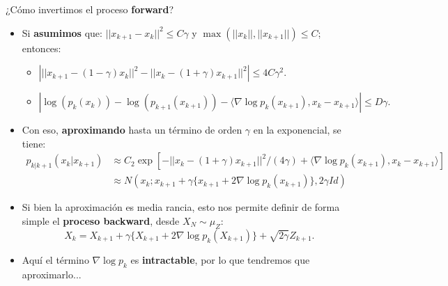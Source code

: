 \documentclass[aspectratio=169,xcolor=dvipsnames, t, spanish]{beamer}
\begin{document}
    \begin{frame}{¿Cómo invertimos el proceso \textbf{forward}?}
        \begin{itemize}
            \item Si \textbf{asumimos} que: $||x_{k+1}-x_{k}||^{2}\le C\gamma$ y $\max(||x_{k}||,||x_{k+1}||)\le C$; entonces:
            \begin{itemize}
                \item $\left| ||x_{k+1}-(1-\gamma)x_{k}||^{2}-||x_{k}-(1+\gamma)x_{k+1}||^{2}\right|\le4C\gamma^{2}.$
                \item $|\log(p_{k}(x_{k}))-\log(p_{k+1}(x_{k+1}))-\langle\nabla \log p_{k}(x_{k+1}),x_{k}-x_{k+1}\rangle|\le D\gamma.$
            \end{itemize}
            \pause
            \item Con eso, \textbf{aproximando} hasta un término de orden $\gamma$ en la exponencial, se tiene:
            \begin{align*}
            p_{k|k+1}(x_{k}|x_{k+1}) &\approx C_{2}\exp\left[-||x_{k}-(1+\gamma)x_{k+1}||^{2}/(4\gamma)+\langle\nabla \log p_{k}(x_{k+1}),x_{k}-x_{k+1}\rangle\right] \\
            &\approx N(x_{k};x_{k+1}+\gamma\{x_{k+1}+2\nabla \log p_{k}(x_{k+1})\},2\gamma Id)
            \end{align*}
            \pause
    
            \item Si bien la aproximación es media rancia, esto nos permite definir de forma simple el \textbf{proceso backward}, desde $X_{N}\sim \mu_Z$:
            \[ X_{k}=X_{k+1}+\gamma\{X_{k+1}+2\nabla \log p_{k}(X_{k+1})\}+\sqrt{2\gamma}Z_{k+1}. \]
            \item Aquí el término $\nabla \log p_{k}$ es \textbf{intractable}, por lo que tendremos que aproximarlo...
        \end{itemize}
    \end{frame}
    
\end{document}
